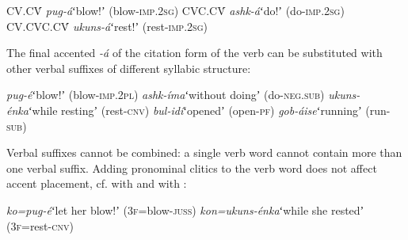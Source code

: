 \documentclass[output=paper]{LSP/langsci}
\begin{document}
\begin{exe}
\ex \begin{xlist}
\ex CV.CV́ \hspace{12mm}\textit{pug-á}\hspace{12mm}ʻblow!ʼ (blow-\textsc{imp}.2\textsc{sg})
\ex CVC.CV́ \hspace{9mm}\textit{ashk-á}\hspace{11mm}ʻdo!ʼ (do-\textsc{imp}.2\textsc{sg})
\ex CV.CVC.CV́ \hspace{3mm}\textit{ukuns-á}\hspace{10mm}ʻrest!ʼ (rest-\textsc{imp}.2\textsc{sg})
\end{xlist}
\end{exe}
The final accented \textit{-á} of the citation form of the verb can be substituted with other verbal suffixes of different syllabic structure:

\begin{exe}
\ex \begin{xlist}
\ex \textit{pug-é}\hspace{13mm}ʻblow!ʼ (blow-\textsc{imp}.2\textsc{pl}) \label{ex:Petrollino:pugé}
\ex \textit{ashk-íma}\hspace{7mm}ʻwithout doingʼ (do-\textsc{neg}.\textsc{sub})
\ex \textit{ukuns-énka}\hspace{4mm}ʻwhile restingʼ (rest-\textsc{cnv}) \label{ex:Petrollino:uskenka}
\ex \textit{bul-idí}\hspace{12mm}ʻopenedʼ (open-\textsc{pf})
\ex \textit{gob-áise}\hspace{10mm}ʻrunningʼ (run-\textsc{sub})
\end{xlist} \label{ex:Petrollino:grammaticalstress}
\end{exe}

Verbal suffixes cannot be combined: a single verb word cannot contain more than one verbal suffix. Adding pronominal  clitics to the verb word does not affect accent placement, cf.  with  and  with :

\begin{exe}
\ex \begin{xlist}
\ex \textit{ko=pug-é}\hspace{11mm}ʻlet her blow!ʼ (3\textsc{f}=blow-\textsc{juss}) \label{ex:Petrollino:kopugé}
\ex \textit{kon=ukuns-énka}\hspace{1mm}ʻwhile she restedʼ (3\textsc{f}=rest-\textsc{cnv}) \label{ex:Petrollino:konuskenka}
\end{xlist}
\end{exe}
\end{document}
